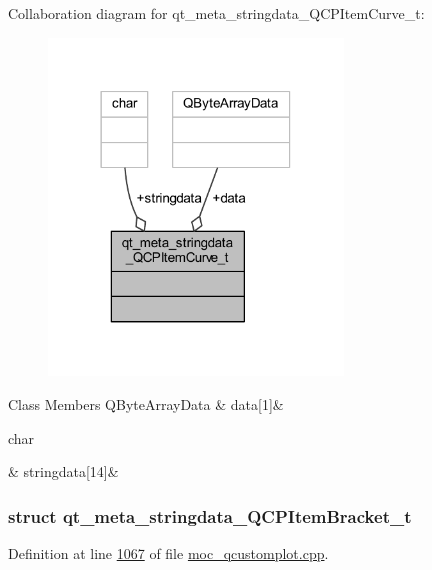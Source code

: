 Collaboration diagram for qt\+\_\+meta\+\_\+stringdata\+\_\+\+Q\+C\+P\+Item\+Curve\+\_\+t\+:
\nopagebreak
\begin{figure}[H]
\begin{center}
\leavevmode
\includegraphics[width=222pt]{db/dd9/a00179}
\end{center}
\end{figure}
\begin{DoxyFields}{Class Members}
\hypertarget{a00016_a0424f9a0b87bc8cefa2966874c4c5667}{Q\+Byte\+Array\+Data}\label{a00016_a0424f9a0b87bc8cefa2966874c4c5667}
&
data\mbox{[}1\mbox{]}&
\\
\hline

\hypertarget{a00016_af1db92bb182f435f88c938cc13a52a2c}{char}\label{a00016_af1db92bb182f435f88c938cc13a52a2c}
&
stringdata\mbox{[}14\mbox{]}&
\\
\hline

\end{DoxyFields}
\label{d3/d32/a00105}
\hypertarget{a00016_d3/d32/a00105}{}
\subsubsection{struct qt\+\_\+meta\+\_\+stringdata\+\_\+\+Q\+C\+P\+Item\+Bracket\+\_\+t}


Definition at line \hyperlink{a00016_source_l01067}{1067} of file \hyperlink{a00016_source}{moc\+\_\+qcustomplot.\+cpp}.



